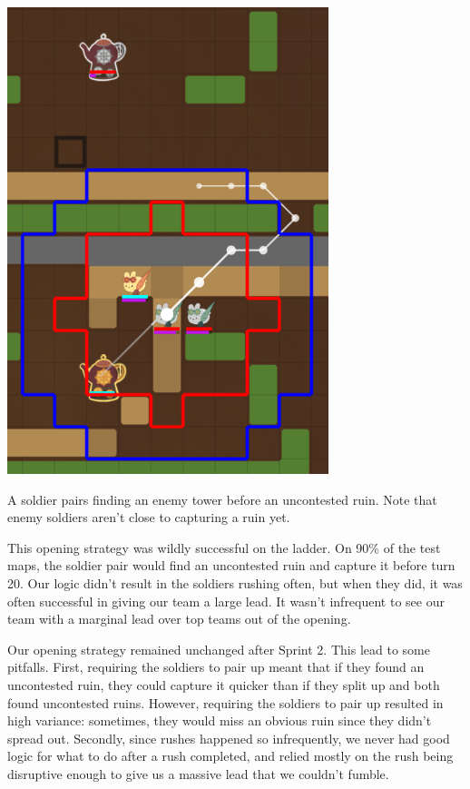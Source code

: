 \begin{center}
  \includegraphics[scale=0.1]{images/rush.png}
  \caption{A soldier pairs finding an enemy tower before an uncontested ruin. Note that enemy soldiers aren't close to capturing a ruin yet.}
\end{center}

\medskip

This opening strategy was wildly successful on the ladder. On 90\% of the test maps, the soldier pair would find an uncontested ruin and capture it before turn 20. Our logic didn't result in the soldiers rushing often, but when they did, it was often successful in giving our team a large lead. It wasn't infrequent to see our team with a marginal lead over top teams out of the opening.

\medskip

Our opening strategy remained unchanged after Sprint 2. This lead to some pitfalls. First, requiring the soldiers to pair up meant that if they found an uncontested ruin, they could capture it quicker than if they split up and both found uncontested ruins. However, requiring the soldiers to pair up resulted in high variance: sometimes, they would miss an obvious ruin since they didn't spread out. Secondly, since rushes happened so infrequently, we never had good logic for what to do after a rush completed, and relied mostly on the rush being disruptive enough to give us a massive lead that we couldn't fumble.


